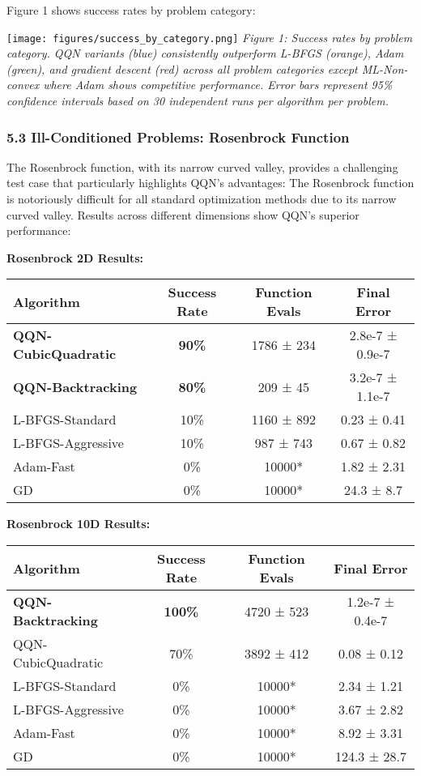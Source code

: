 Figure 1 shows success rates by problem category:

\texttt{[image: figures/success\_by\_category.png]}
\emph{Figure 1: Success rates by problem category. QQN variants (blue) consistently outperform L-BFGS (orange), Adam (green), and gradient descent (red) across all problem categories except ML-Non-convex where Adam shows competitive performance. Error bars represent 95\% confidence intervals based on 30 independent runs per algorithm per problem.}

\hypertarget{ill-conditioned-problems-rosenbrock-function}{%
\subsubsection{5.3 Ill-Conditioned Problems: Rosenbrock Function}\label{ill-conditioned-problems-rosenbrock-function}}

The Rosenbrock function, with its narrow curved valley, provides a challenging test case that particularly highlights
QQN's advantages:
The Rosenbrock function is notoriously difficult for all standard optimization methods due to its narrow curved valley.
Results across different dimensions show QQN's superior performance:

\textbf{Rosenbrock 2D Results:}

\begin{tabular}{|l|c|c|c|}
\hline
Algorithm & Success Rate & Function Evals & Final Error \\
\hline
\textbf{QQN-CubicQuadratic} & \textbf{90\%} & 1786 ± 234 & 2.8e-7 ± 0.9e-7 \\
\textbf{QQN-Backtracking} & \textbf{80\%} & 209 ± 45 & 3.2e-7 ± 1.1e-7 \\
L-BFGS-Standard & 10\% & 1160 ± 892 & 0.23 ± 0.41 \\
L-BFGS-Aggressive & 10\% & 987 ± 743 & 0.67 ± 0.82 \\
Adam-Fast & 0\% & 10000* & 1.82 ± 2.31 \\
GD & 0\% & 10000* & 24.3 ± 8.7 \\
\hline
\end{tabular}

\textbf{Rosenbrock 10D Results:}

\begin{tabular}{|l|c|c|c|}
\hline
Algorithm & Success Rate & Function Evals & Final Error \\
\hline
\textbf{QQN-Backtracking} & \textbf{100\%} & 4720 ± 523 & 1.2e-7 ± 0.4e-7 \\
QQN-CubicQuadratic & 70\% & 3892 ± 412 & 0.08 ± 0.12 \\
L-BFGS-Standard & 0\% & 10000* & 2.34 ± 1.21 \\
L-BFGS-Aggressive & 0\% & 10000* & 3.67 ± 2.82 \\
Adam-Fast & 0\% & 10000* & 8.92 ± 3.31 \\
GD & 0\% & 10000* & 124.3 ± 28.7 \\
\hline
\end{tabular}

